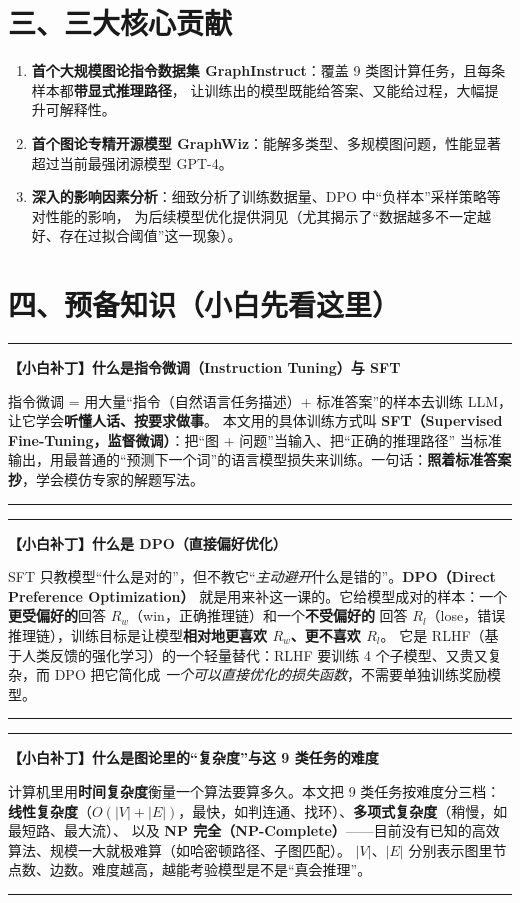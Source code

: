 \documentclass[11pt,UTF8,fontset=fandol]{ctexart}
\newenvironment{tip}[1]{%
  \par\smallskip\noindent\rule{\linewidth}{0.4pt}\par\nobreak
  \noindent\textbf{【小白补丁】#1}\par\nobreak\noindent\ignorespaces
}{%
  \par\noindent\rule{\linewidth}{0.4pt}\par\smallskip
}
\begin{document}
\section{三、三大核心贡献}
\begin{enumerate}[leftmargin=2em]
  \item \textbf{首个大规模图论指令数据集 GraphInstruct}：覆盖 9 类图计算任务，且每条样本都\textbf{带显式推理路径}，
        让训练出的模型既能给答案、又能给过程，大幅提升可解释性。
  \item \textbf{首个图论专精开源模型 GraphWiz}：能解多类型、多规模图问题，性能显著超过当前最强闭源模型 GPT-4。
  \item \textbf{深入的影响因素分析}：细致分析了训练数据量、DPO 中“负样本”采样策略等对性能的影响，
        为后续模型优化提供洞见（尤其揭示了“数据越多不一定越好、存在过拟合阈值”这一现象）。
\end{enumerate}

\section{四、预备知识（小白先看这里）}

\begin{tip}{什么是指令微调（Instruction Tuning）与 SFT}
指令微调 = 用大量“指令（自然语言任务描述）+ 标准答案”的样本去训练 LLM，让它学会\textbf{听懂人话、按要求做事}。
本文用的具体训练方式叫 \textbf{SFT（Supervised Fine-Tuning，监督微调）}：把“图 + 问题”当输入、把“正确的推理路径”
当标准输出，用最普通的“预测下一个词”的语言模型损失来训练。一句话：\textbf{照着标准答案抄}，学会模仿专家的解题写法。
\end{tip}

\begin{tip}{什么是 DPO（直接偏好优化）}
SFT 只教模型“什么是对的”，但不教它“\emph{主动避开}什么是错的”。\textbf{DPO（Direct Preference Optimization）}
就是用来补这一课的。它给模型成对的样本：一个\textbf{更受偏好的}回答 $R_w$（win，正确推理链）和一个\textbf{不受偏好的}
回答 $R_l$（lose，错误推理链），训练目标是让模型\textbf{相对地更喜欢 $R_w$、更不喜欢 $R_l$}。
它是 RLHF（基于人类反馈的强化学习）的一个轻量替代：RLHF 要训练 4 个子模型、又贵又复杂，而 DPO 把它简化成
\emph{一个可以直接优化的损失函数}，不需要单独训练奖励模型。
\end{tip}

\begin{tip}{什么是图论里的“复杂度”与这 9 类任务的难度}
计算机里用\textbf{时间复杂度}衡量一个算法要算多久。本文把 9 类任务按难度分三档：
\textbf{线性复杂度}（$O(|V|+|E|)$，最快，如判连通、找环）、\textbf{多项式复杂度}（稍慢，如最短路、最大流）、
以及 \textbf{NP 完全（NP-Complete）}——目前没有已知的高效算法、规模一大就极难算（如哈密顿路径、子图匹配）。
$|V|$、$|E|$ 分别表示图里节点数、边数。难度越高，越能考验模型是不是“真会推理”。
\end{tip}
\end{document}
